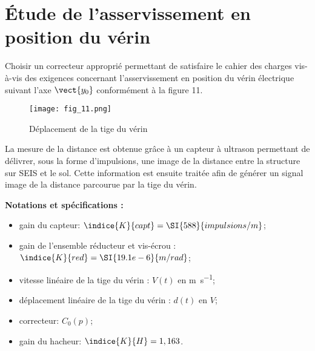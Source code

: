 \section{Étude de l’asservissement en position du vérin}

\begin{obj}
Choisir un correcteur approprié permettant de satisfaire le cahier des charges vis-à-vis des 
exigences concernant l’asservissement en position du vérin électrique suivant l’axe $\vect{y_0}$
conformément à la figure 11.
\end{obj}

\begin{figure}[!h]
\centering
\texttt{[image: fig\_11.png]}
\caption{Déplacement de la tige du vérin\label{fig_11}}
\end{figure}

La mesure de la distance est obtenue grâce à un capteur à ultrason permettant de délivrer, sous la 
forme d’impulsions, une image de la distance entre la structure sur SEIS et le sol. Cette information 
est ensuite traitée afin de générer un signal image de la distance parcourue par la tige du vérin.

%

\textbf{Notations et spécifications :}
\begin{multicols}{2}
\begin{itemize}
\item gain du capteur: $\indice{K}{capt} = \SI{588}{impulsions/m}$;
\item gain de l’ensemble réducteur et vis-écrou : $\indice{K}{red} = \SI{19.1e-6}{m/rad}$;
\item vitesse linéaire de la tige du vérin : $V(t)$ en \si{m.s^{-1}};
\item déplacement linéaire de la tige du vérin : $d(t)$ en $\si{V}$;
\item correcteur: $C_0(p)$;
\item gain du hacheur: $\indice{K}{H} = 1,163$.
\end{itemize}
\end{multicols}

